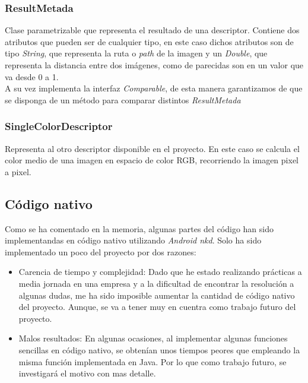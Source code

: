\subsubsection{ResultMetada}

Clase parametrizable que representa el resultado de una descriptor. Contiene dos atributos que pueden ser de cualquier tipo, en este caso dichos atributos son de tipo \textit{String}, que representa la ruta o \textit{path} de la imagen y un \textit{Double}, que representa la distancia entre dos imágenes, como de parecidas son en un valor que va desde 0 a 1.\\

A su vez implementa la interfaz \textit{Comparable}, de esta manera garantizamos de que se disponga de un método para comparar distintos \textit{ResultMetada}

\subsubsection{SingleColorDescriptor}

Representa al otro descriptor disponible en el proyecto. En este caso se calcula el color medio de una imagen en espacio de color RGB, recorriendo la imagen pixel a pixel.

\subsection{Código nativo}

Como se ha comentado en la memoria, algunas partes del código han sido implementandas en código nativo utilizando \textit{Android nkd}. Solo ha sido implementado un poco del proyecto por dos razones:

\begin{itemize}
\item Carencia de tiempo y complejidad: Dado que he estado realizando prácticas a media jornada en una empresa y a la dificultad de encontrar la resolución a algunas dudas, me ha sido imposible aumentar la cantidad de código nativo del proyecto. Aunque, se va a tener muy en cuentra como trabajo futuro del proyecto.

\item Malos resultados: En algunas ocasiones, al implementar algunas funciones sencillas en código nativo, se obtenían unos tiempos peores que empleando la misma función implementada en Java. Por lo que como trabajo futuro, se investigará el motivo con mas detalle. 

\end{itemize} 
